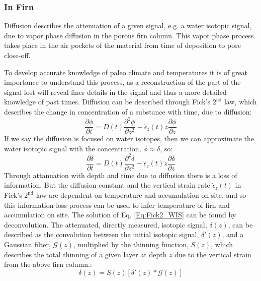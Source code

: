 \documentclass[../../CompleteThesis2/Complete_2ndDraft]{subfiles}
\begin{document}
\subsubsection{In Firn}
\label{Subsubsec:Ice_DiffusionAndDensification_Diffusion_Firn}
Diffusion describes the attenuation of a given signal, e.g. a water isotopic signal, due to vapor phase diffusion in the porous firn column. This vapor phase process takes place in the air pockets of the material from time of deposition to pore close-off. 

To develop accurate knowledge of paleo climate and temperatures it is of great importance to understand this process, as a reconstruction of the part of the signal lost will reveal finer details in the signal and thus a more detailed knowledge of past times. 
Diffusion can be described through Fick's $2^{\text{nd}}$ law, which describes the change in concentration of a substance with time, due to diffusion:
\begin{equation}
	\frac{\partial \phi}{\partial t} = D(t) \frac{\partial^2 \phi}{\partial z^2} - \dot{\epsilon}_z(t) z \frac{\partial \phi}{\partial z}
	\label{Eq:Fick2_concentration}
\end{equation}
If we say the diffusion is focused on water isotopes, then we can approximate the water isotopic signal with the concentration, $\phi \approx \delta$, so:
\begin{equation}
	\frac{\partial \delta}{\partial t} = D(t) \frac{\partial^2 \delta}{\partial z^2} - \dot{\epsilon}_z(t) z \frac{\partial \delta}{\partial z}
	\label{Eq:Fick2_WIS}
\end{equation}
Through attanuation with depth and time due to diffusion there is a loss of information. But the diffusion constant and the vertical strain rate $\dot{\epsilon}_z(t)$ in Fick's $2^{\text{nd}}$ law are dependent on temperature and accumulation on site, and so this information loss process can be used to infer temperature of firn and accumulation on site. 
The solution of Eq. \ref{Eq:Fick2_WIS} can be found by deconvolution. The attenuated, directly measured, isotopic signal, $\delta(z)$, can be described as the convolution between the initial isotopic signal, $\delta '(z)$, and a Gaussian filter, $\mathcal{G}(z)$, multiplied by the thinning function, $S(z)$, which describes the total thinning of a given layer at depth $z$ due to the vertical strain from the above firn column.:
\begin{equation}
	\delta(z) = S(z)[\delta'(z)*\mathcal{G}(z)]
	\label{Eq:diff_solution_conv}
\end{equation}
\end{document}
